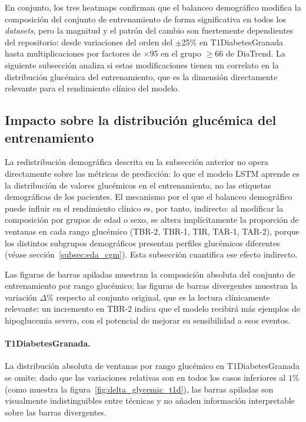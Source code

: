 En conjunto, los tres heatmaps confirman que el balanceo demográfico modifica
la composición del conjunto de entrenamiento de forma significativa en todos
los \textit{datasets}, pero la magnitud y el patrón del cambio son
fuertemente dependientes del repositorio: desde variaciones del orden del
$\pm$25\% en T1DiabetesGranada hasta multiplicaciones por factores de
$\times$95 en el grupo $\geq$66 de DiaTrend. La siguiente subsección analiza
si estas modificaciones tienen un correlato en la distribución glucémica del
entrenamiento, que es la dimensión directamente relevante para el rendimiento
clínico del modelo.




\subsection{Impacto sobre la distribución glucémica del entrenamiento}
\label{subsec:impacto_glucemico}

La redistribución demográfica descrita en la subsección anterior no opera
directamente sobre las métricas de predicción: lo que el modelo LSTM aprende
es la distribución de valores glucémicos en el entrenamiento, no las etiquetas
demográficas de los pacientes. El mecanismo por el que el balanceo demográfico
puede influir en el rendimiento clínico es, por tanto, indirecto: al modificar
la composición por grupos de edad o sexo, se altera implícitamente la
proporción de ventanas en cada rango glucémico (TBR-2, TBR-1, TIR, TAR-1,
TAR-2), porque los distintos subgrupos demográficos presentan perfiles
glucémicos diferentes (véase sección~\ref{subsec:eda_cgm}). Esta subsección
cuantifica ese efecto indirecto.

Las figuras de barras apiladas muestran la composición absoluta del conjunto
de entrenamiento por rango glucémico; las figuras de barras divergentes
muestran la variación $\Delta\%$ respecto al conjunto original, que es la
lectura clínicamente relevante: un incremento en TBR-2 indica que el modelo
recibirá más ejemplos de hipoglucemia severa, con el potencial de mejorar
su sensibilidad a esos eventos.

\paragraph{T1DiabetesGranada.}

La distribución absoluta de ventanas por rango glucémico en T1DiabetesGranada se omite: dado que las variaciones relativas son en todos los casos inferiores al 
$1\%$ (como muestra la figura~\ref{fig:delta_glycemic_t1d}), las barras apiladas son visualmente indistinguibles entre técnicas y no añaden información interpretable sobre las barras divergentes.

